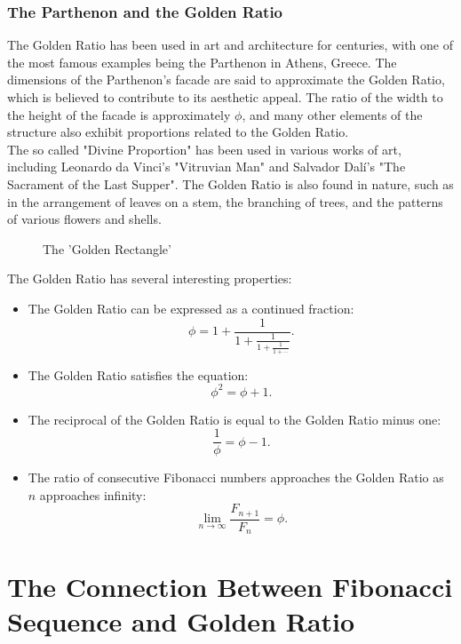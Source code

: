 \documentclass[openany]{book}
\begin{document}
\subsection{The Parthenon and the Golden Ratio}
The Golden Ratio has been used in art and architecture for centuries, with one of the most famous examples being the Parthenon in Athens, Greece. The dimensions of the Parthenon's facade are said to approximate the Golden Ratio, which is believed to contribute to its aesthetic appeal. The ratio of the width to the height of the facade is approximately $\phi$, and many other elements of the structure also exhibit proportions related to the Golden Ratio. \\
The so called "Divine Proportion" has been used in various works of art, including Leonardo da Vinci's "Vitruvian Man" and Salvador Dalí's "The Sacrament of the Last Supper". The Golden Ratio is also found in nature, such as in the arrangement of leaves on a stem, the branching of trees, and the patterns of various flowers and shells.
\begin{figure}[H]
    \centering
    \caption{The 'Golden Rectangle'}
\end{figure}
The Golden Ratio has several interesting properties:
\begin{itemize}
    \item The Golden Ratio can be expressed as a continued fraction:
    \[
        \phi = 1 + \frac{1}{1 + \frac{1}{1 + \frac{1}{1 + \cdots}}}.
    \]
    \item The Golden Ratio satisfies the equation:
    \[
        \phi^2 = \phi + 1.
    \]
    \item The reciprocal of the Golden Ratio is equal to the Golden Ratio minus one:
    \[
        \frac{1}{\phi} = \phi - 1.
    \]
    \item The ratio of consecutive Fibonacci numbers approaches the Golden Ratio as $n$ approaches infinity:
    \[
        \lim_{n \to \infty} \frac{F_{n+1}}{F_n} = \phi.
    \]
\end{itemize}


\chapter{The Connection Between Fibonacci Sequence and Golden Ratio}
\end{document}
